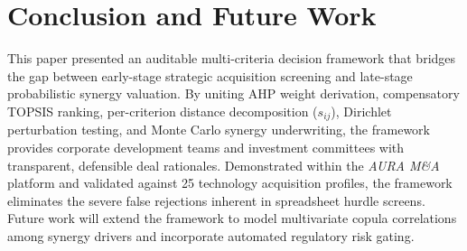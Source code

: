 \documentclass[conference]{IEEEtran}
\begin{document}
\section{Conclusion and Future Work}
This paper presented an auditable multi-criteria decision framework that bridges the gap between early-stage strategic acquisition screening and late-stage probabilistic synergy valuation. By uniting AHP weight derivation, compensatory TOPSIS ranking, per-criterion distance decomposition ($s_{ij}$), Dirichlet perturbation testing, and Monte Carlo synergy underwriting, the framework provides corporate development teams and investment committees with transparent, defensible deal rationales. Demonstrated within the \textit{AURA M\&A} platform and validated against 25 technology acquisition profiles, the framework eliminates the severe false rejections inherent in spreadsheet hurdle screens. Future work will extend the framework to model multivariate copula correlations among synergy drivers and incorporate automated regulatory risk gating.



\end{document}
